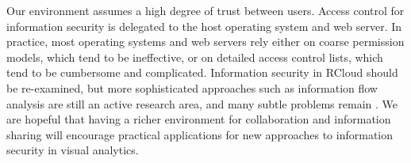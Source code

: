 Our environment assumes a high degree of trust between users.
Access control for information security is delegated to the host
operating system and web server. In practice, most operating
systems and web servers rely either on coarse permission models,
which tend to be ineffective, or on detailed access control
lists, which tend to be cumbersome and complicated. 
Information security in RCloud should be re-examined, but more
sophisticated approaches such as information flow analysis are
still an active research area, and many subtle problems remain
\cite{Moore:2011:SAF}. We are hopeful that having a richer
environment for collaboration and information sharing will encourage
practical applications for new approaches to information security
in visual analytics.

